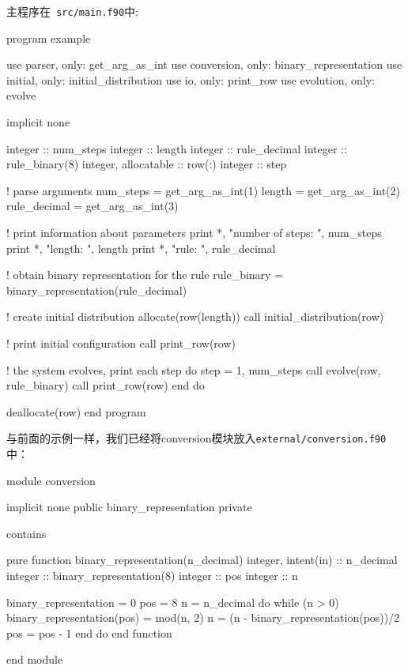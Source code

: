 主程序在\texttt{ src/main.f90}中:

\begin{codebox}[fortran]
program example

  use parser, only: get_arg_as_int
  use conversion, only: binary_representation
  use initial, only: initial_distribution
  use io, only: print_row
  use evolution, only: evolve
  
  implicit none
  
  integer :: num_steps
  integer :: length
  integer :: rule_decimal
  integer :: rule_binary(8)
  integer, allocatable :: row(:)
  integer :: step
  
  ! parse arguments
  num_steps = get_arg_as_int(1)
  length = get_arg_as_int(2)
  rule_decimal = get_arg_as_int(3)
  
  ! print information about parameters
  print *, "number of steps: ", num_steps
  print *, "length: ", length
  print *, "rule: ", rule_decimal
  
  ! obtain binary representation for the rule
  rule_binary = binary_representation(rule_decimal)
  
  ! create initial distribution
  allocate(row(length))
  call initial_distribution(row)
  
  ! print initial configuration
  call print_row(row)
  
  ! the system evolves, print each step
  do step = 1, num_steps
    call evolve(row, rule_binary)
    call print_row(row)
  end do
  
  deallocate(row)
end program
\end{codebox}

与前面的示例一样，我们已经将conversion模块放入\texttt{external/conversion.f90}中：

\begin{codebox}[fortran]
module conversion

  implicit none
  public binary_representation
  private
  
contains

  pure function binary_representation(n_decimal)
    integer, intent(in) :: n_decimal
    integer :: binary_representation(8)
    integer :: pos
    integer :: n
    
    binary_representation = 0
    pos = 8
    n = n_decimal
    do while (n > 0)
      binary_representation(pos) = mod(n, 2)
      n = (n - binary_representation(pos))/2
      pos = pos - 1
    end do
  end function
  
end module
\end{codebox}

